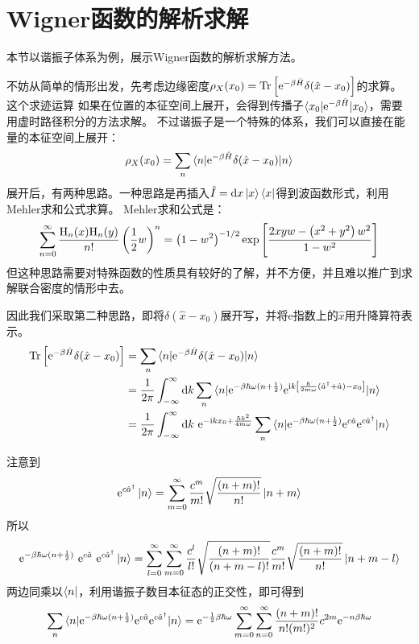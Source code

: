     \section{Wigner函数的解析求解}

    本节以谐振子体系为例，展示Wigner函数的解析求解方法。

    不妨从简单的情形出发，先考虑边缘密度\(\rho_X(x_0) = \textrm{Tr}\left[ \mathrm{e}^{-\beta \hat{H}}\delta(\hat{x} - x_0)\right]\)的求算。
    这个求迹运算
    如果在位置的本征空间上展开，会得到传播子\(\braket{x_0 | \mathrm{e}^{-\beta \hat{H}} | x_0}\)，需要用虚时路径积分的方法求解。
    不过谐振子是一个特殊的体系，我们可以直接在能量的本征空间上展开：
    \[
        \rho_X(x_0) = \sum_n \braket{n | \mathrm{e}^{-\beta \hat{H}} \delta(\hat{x} - x_0) | n}
    \]
    展开后，有两种思路。一种思路是再插入\(\hat{I} = \mathrm{d} x \ket{x}\bra{x}\)得到波函数形式，利用Mehler求和公式求算。
    Mehler求和公式是：
    \[
        \sum_{n=0}^{\infty} \frac{\mathrm{H}_{n}(x) \mathrm{H}_{n}(y)}{n !}\left(\frac{1}{2} w\right)^{n}
        =\left(1-w^{2}\right)^{-1 / 2} \exp \left[\frac{2 x y w-\left(x^{2}+y^{2}\right) w^{2}}{1-w^{2}}\right]
    \]
    但这种思路需要对特殊函数的性质具有较好的了解，并不方便，并且难以推广到求解联合密度的情形中去。

    因此我们采取第二种思路，即将\(\delta(\hat{x} - x_0)\)展开写，并将e指数上的\(\hat{x}\)用升降算符表示。
    \begin{equation}\label{trace}
        \begin{aligned}
            \textrm{Tr}\left[\mathrm{e}^{-\beta \hat{H}}\delta(\hat{x} - x_0)\right] &= \sum_n \braket{n | \mathrm{e}^{-\beta \hat{H}}\delta(\hat{x} - x_0) | n}
            \\ &= \frac{1}{2\pi} \int_{-\infty}^{\infty} \mathrm{d} k \sum_n \braket{n |  \mathrm{e}^{-\beta\hbar\omega(n+\frac{1}{2})} \mathrm{e}^{\mathrm{i} k \left[\frac{\hbar}{2m\omega}(\hat{a}^\dagger + \hat{a}) - x_0\right]}  | n}
            \\ &= \frac{1}{2\pi} \int_{-\infty}^{\infty} \mathrm{d} k ~  \mathrm{e}^{-\mathrm{i} k x_0 + \frac{\hbar k^2}{4m\omega}} \sum_n\braket{n | \mathrm{e}^{-\beta\hbar\omega(n+\frac{1}{2})} \mathrm{e}^{c\hat{a}} \mathrm{e}^{c\hat{a}^\dagger}  | n}
        \end{aligned}
    \end{equation}
    
    注意到
    \[
        \mathrm{e}^{c\hat{a}^\dagger}\ket{n} = \sum_{m=0}^{\infty} \frac{c^m}{m!}\sqrt{\frac{(n+m)!}{n!}}\ket{n+m}
    \]
    所以
    \[
        \mathrm{e}^{-\beta\hbar\omega(n+\frac{1}{2})}~ \mathrm{e}^{c\hat{a}}~ \mathrm{e}^{c\hat{a}^\dagger} \ket{n}
         = \sum_{l=0}^{\infty} \sum_{m=0}^{\infty} \frac{c^l}{l!}\sqrt{\frac{(n+m)!}{(n+m-l)!}} \frac{c^m}{m!}\sqrt{\frac{(n+m)!}{n!}} \ket{n+m-l}
    \]
    两边同乘以\(\bra{n}\)，利用谐振子数目本征态的正交性，即可得到
    \begin{equation}\label{series}
        \sum_n \braket{n | \mathrm{e}^{-\beta\hbar\omega(n+\frac{1}{2})} \mathrm{e}^{c\hat{a}} \mathrm{e}^{c\hat{a}^\dagger}  | n} = \mathrm{e}^{-\frac{1}{2}\beta\hbar\omega} \sum_{m=0}^\infty \sum_{n=0}^\infty \frac{(n+m)!}{n!(m!)^2} c^{2m} \mathrm{e}^{-n\beta\hbar\omega}
    \end{equation}
    
